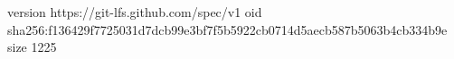 version https://git-lfs.github.com/spec/v1
oid sha256:f136429f7725031d7dcb99e3bf7f5b5922cb0714d5aecb587b5063b4cb334b9e
size 1225
